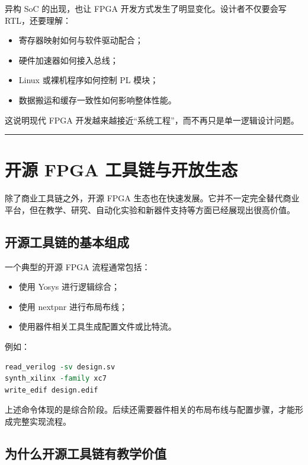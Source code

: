 异构 SoC 的出现，也让 FPGA 开发方式发生了明显变化。设计者不仅要会写
RTL，还要理解：

\begin{itemize}
\tightlist
\item
  寄存器映射如何与软件驱动配合；
\item
  硬件加速器如何接入总线；
\item
  Linux 或裸机程序如何控制 PL 模块；
\item
  数据搬运和缓存一致性如何影响整体性能。
\end{itemize}

这说明现代 FPGA 开发越来越接近``系统工程''，而不再只是单一逻辑设计问题。

\begin{center}\rule{0.5\linewidth}{0.5pt}\end{center}

\section{开源 FPGA
工具链与开放生态}\label{ux5f00ux6e90-fpga-ux5de5ux5177ux94feux4e0eux5f00ux653eux751fux6001}

除了商业工具链之外，开源 FPGA
生态也在快速发展。它并不一定完全替代商业平台，但在教学、研究、自动化实验和新器件支持等方面已经展现出很高价值。

\subsection{开源工具链的基本组成}\label{ux5f00ux6e90ux5de5ux5177ux94feux7684ux57faux672cux7ec4ux6210}

一个典型的开源 FPGA 流程通常包括：

\begin{itemize}
\tightlist
\item
  使用 Yosys 进行逻辑综合；
\item
  使用 nextpnr 进行布局布线；
\item
  使用器件相关工具生成配置文件或比特流。
\end{itemize}

例如：

\begin{lstlisting}[language=tcl]
read_verilog -sv design.sv
synth_xilinx -family xc7
write_edif design.edif
\end{lstlisting}

上述命令体现的是综合阶段。后续还需要器件相关的布局布线与配置步骤，才能形成完整实现流程。

\subsection{为什么开源工具链有教学价值}\label{ux4e3aux4ec0ux4e48ux5f00ux6e90ux5de5ux5177ux94feux6709ux6559ux5b66ux4ef7ux503c}

